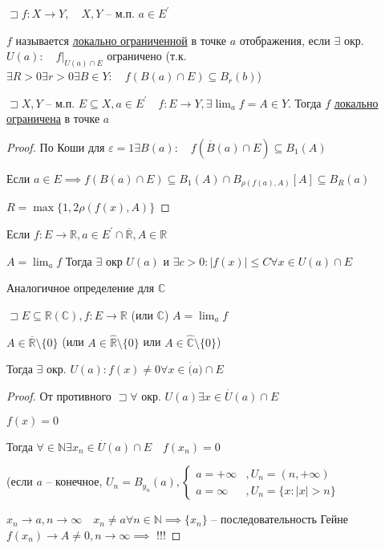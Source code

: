 \documentclass{book}
\newcommand\N{\ensuremath{\mathbb{N}}}
\newcommand\R{\ensuremath{\mathbb{R}}}
\renewcommand\C{\ensuremath{\mathbb{C}}}
\newcommand{\p}[1]{#1^{\prime}}
\newcommand{\ov}[1]{\overline{#1}}
\theoremstyle{definition}
\begin{document}
\begin{definition}
    $\sqsupset f: X\to Y ,\quad X, Y$ -- м.п. $a\in \p E$

    $f$ называется \underline{локально ограниченной} в точке $a$ отображения, если  $\exists $ окр. $U(a):\quad f|_{U(a)\cap E}$ ограничено (т.к. $\exists R>0\exists r>0\exists B\in Y:\quad f\left( B(a)\cap E \right) \subseteq B_r(b)$)
\end{definition}

\begin{theorem}

    $\sqsupset X, Y$ -- м.п. $E\subseteq X, a\in \p E\quad f:E\to Y, \exists \lim_af =A\in Y$. Тогда $f$ \underline{локально ограничена} в точке $a$
\end{theorem}
\begin{proof}
    По Коши для $\varepsilon=1\exists B(a):\quad f\left( \overset{\cdot }B(a)\cap E \right) \subseteq B_1(A)$

    Если $a\in E \implies f\left( B(a)\cap E \right) \subseteq B_1(A)\cap B_{\rho(f(a), A)}[A] \subseteq B_R(a)\quad$ 

    $ R = \max\{1, 2\rho(f(x), A)\}$
\end{proof}

\begin{theorem}

    Если $f:E\to \R, a\in \p E\cap \ov{\R}, A\in \R$

    $A = \lim_af$ Тогда  $\exists $ окр $U(a)$ и $ \exists c>0: |f(x)|\leqslant C \forall x\in U(a)\cap E$ 

    Аналогичное определение для $\C$
\end{theorem}

\begin{statement}

    $\sqsupset E\subseteq \R(\C), f:E\to \R$ (или $\C$) $A = \lim_af$

    $A\in \ov{\R}\setminus \{0\}$ (или $A\in \widehat{\R}\setminus \{0\}$ или $A\in \widehat{\C}\setminus \{0\}$)

    Тогда $\exists $ окр. $U(a): f(x)\neq 0 \forall x\in \overset{\cdot }(a)\cap E$
\end{statement}
\begin{proof}
    От противного $\sqsupset \forall $ окр. $U(a) \exists x\in \overset{\cdot }U(a)\cap E$

    $f(x) = 0$

    Тогда $\forall \in \N \exists x_{n} \in \overset{\cdot }U(a)\cap E\quad f(x_{n} )=0$

    (если $a$ -- конечное,  $U_n = B_{y_n}(a), \begin{cases}
        a = +\infty &, U_n = (n, +\infty )\\
        a = \infty &, U_n = \{x:|x|>n\}
    \end{cases}$

    $x_{n} \to a, n\to \infty \quad x_{n} \neq a \forall n\in \N  \implies \{x_{n} \}$ -- последовательность Гейне $f(x_{n} )\to A\neq 0, n\to \infty  \implies $ !!!
\end{proof}
\end{document}
